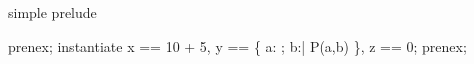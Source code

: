 \begin{zsection}
   \SECTION simple \parents prelude
\end{zsection}

\begin{zproof}[qntCmd]
prenex;
instantiate x == 10 + 5, y == \{ a: \nat; b:\nat | P(a,b) \},
    z == 0;
prenex;
\end{zproof}
